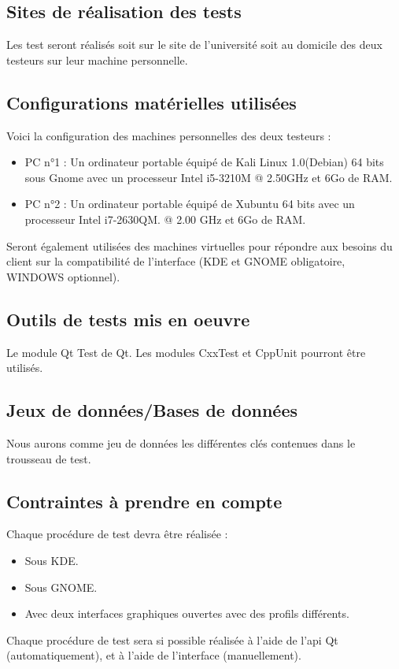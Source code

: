 \documentclass{../res/univ-projet}
\begin{document}
\subsection{Sites de réalisation des tests}
Les test seront réalisés soit sur le site de l'université soit au domicile des deux testeurs sur leur machine personnelle.



\subsection{Configurations matérielles utilisées}
Voici la configuration des machines personnelles des deux testeurs :
\begin{itemize}
 \item PC n°1 : Un ordinateur portable équipé de Kali Linux 1.0(Debian) 64 bits sous Gnome avec un processeur Intel i5-3210M @ 2.50GHz et 6Go de RAM.
 \item PC n°2 : Un ordinateur portable équipé de Xubuntu 64 bits avec un processeur Intel i7-2630QM.
 @ 2.00 GHz et 6Go de RAM.
\end{itemize}
Seront également utilisées des machines virtuelles pour répondre aux besoins du client sur la compatibilité de l'interface (KDE et GNOME obligatoire,
WINDOWS optionnel).

\subsection{Outils de tests mis en oeuvre}
Le module Qt Test de Qt.
Les modules CxxTest et CppUnit pourront être utilisés.

\subsection{Jeux de données/Bases de données}
Nous aurons comme jeu de données les différentes clés contenues dans le trousseau de test.


\subsection{Contraintes à prendre en compte}
Chaque procédure de test devra être réalisée :
\begin{itemize}
 \item Sous KDE.
 \item Sous GNOME.
 \item Avec deux interfaces graphiques ouvertes avec des profils différents.
\end{itemize}
Chaque procédure de test sera si possible réalisée à l'aide de l'api Qt (automatiquement), et à l'aide de l'interface (manuellement).
\end{document}
